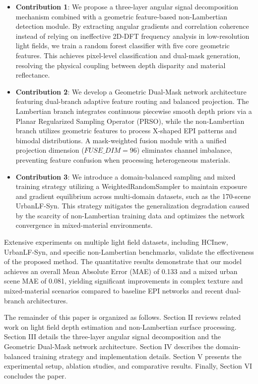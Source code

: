 \begin{itemize}
 \item \textbf{Contribution 1}: We propose a three-layer angular signal decomposition mechanism combined with a geometric feature-based non-Lambertian detection module. By extracting angular gradients and correlation coherence instead of relying on ineffective 2D-DFT frequency analysis in low-resolution light fields, we train a random forest classifier with five core geometric features. This achieves pixel-level classification and dual-mask generation, resolving the physical coupling between depth disparity and material reflectance.
 \item \textbf{Contribution 2}: We develop a Geometric Dual-Mask network architecture featuring dual-branch adaptive feature routing and balanced projection. The Lambertian branch integrates continuous piecewise smooth depth priors via a Planar Regularized Sampling Operator (PRSO), while the non-Lambertian branch utilizes geometric features to process X-shaped EPI patterns and bimodal distributions. A mask-weighted fusion module with a unified projection dimension ($FUSE\_DIM=96$) eliminates channel imbalance, preventing feature confusion when processing heterogeneous materials.
 \item \textbf{Contribution 3}: We introduce a domain-balanced sampling and mixed training strategy utilizing a WeightedRandomSampler to maintain exposure and gradient equilibrium across multi-domain datasets, such as the 170-scene UrbanLF-Syn. This strategy mitigates the generalization degradation caused by the scarcity of non-Lambertian training data and optimizes the network convergence in mixed-material environments.
\end{itemize}
Extensive experiments on multiple light field datasets, including HCInew, UrbanLF-Syn, and specific non-Lambertian benchmarks, validate the effectiveness of the proposed method. The quantitative results demonstrate that our model achieves an overall Mean Absolute Error (MAE) of 0.133 and a mixed urban scene MAE of 0.081, yielding significant improvements in complex texture and mixed-material scenarios compared to baseline EPI networks and recent dual-branch architectures.

The remainder of this paper is organized as follows. Section II reviews related work on light field depth estimation and non-Lambertian surface processing. Section III details the three-layer angular signal decomposition and the Geometric Dual-Mask network architecture. Section IV describes the domain-balanced training strategy and implementation details. Section V presents the experimental setup, ablation studies, and comparative results. Finally, Section VI concludes the paper.
